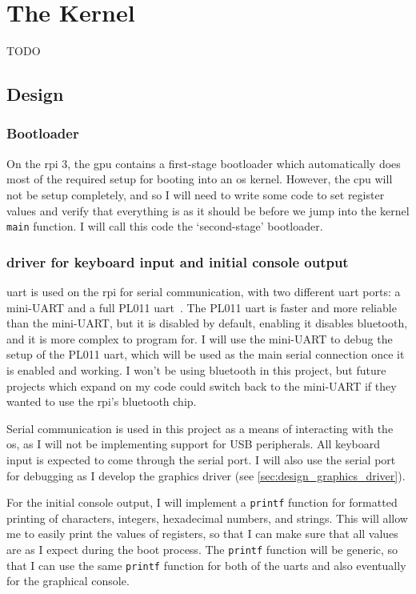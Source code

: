 \documentclass{article}
\begin{document}
\section{The Kernel}
TODO
\subsection{Design}
\label{sec:kernel_design}

\subsubsection{Bootloader}
On the \gls{rpi} 3, the \gls{gpu} contains a first-stage bootloader which
automatically does most of the required setup for booting into an \gls{os}
kernel. However, the \gls{cpu} will not be setup completely, and so I will need
to write some code to set register values and verify that everything is as it
should be before we jump into the kernel \texttt{main} function. I will call
this code the `second-stage' bootloader.

\subsubsection{\texorpdfstring{}{UART} driver for keyboard
input and initial console output}
\gls{uart} is used on the \gls{rpi} for serial communication, with two
different \gls{uart} ports: a mini-UART and a full PL011
\gls{uart}~\cite{rpi-uarts}. The PL011 \gls{uart} is faster and more reliable
than the mini-UART, but it is disabled by default, enabling it disables
bluetooth, and it is more complex to program for. I will use the mini-UART to
debug the setup of the PL011 \gls{uart}, which will be used as the main serial
connection once it is enabled and working. I won't be using bluetooth in this
project, but future projects which expand on my code could switch back to the
mini-UART if they wanted to use the \gls{rpi}'s bluetooth chip.

Serial communication is used in this project as a means of interacting with the
\gls{os}, as I will not be implementing support for USB peripherals. All
keyboard input is expected to come through the serial port. I will also use the
serial port for debugging as I develop the graphics driver (see
\autoref{sec:design_graphics_driver}).

For the initial console output, I will implement a \texttt{printf} function for
formatted printing of characters, integers, hexadecimal numbers, and strings.
This will allow me to easily print the values of registers, so that I can make
sure that all values are as I expect during the boot process. The
\texttt{printf} function will be generic, so that I can use the same
\texttt{printf} function for both of the \glspl{uart} and also eventually for
the graphical console.
\end{document}
